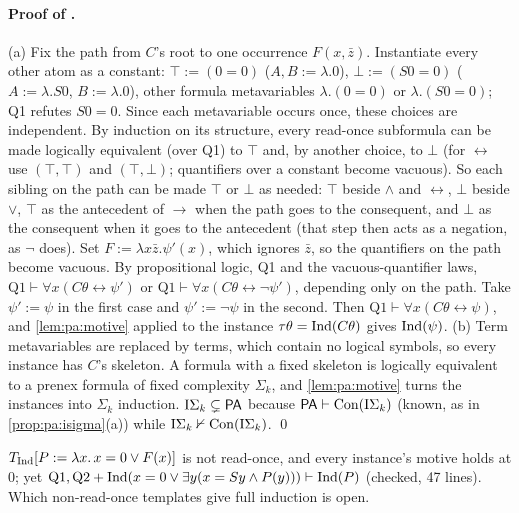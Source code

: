 \paragraph{Proof of .} (a) Fix the path from $C$'s root to one occurrence $F(x,\bar z)$. Instantiate every other atom as a constant: $\top:=(0=0)$ ($A,B:=\lambda.0$), $\bot:=(S0=0)$ ($A:=\lambda.S0$, $B:=\lambda.0$), other formula metavariables $\lambda.(0=0)$ or $\lambda.(S0=0)$; Q1 refutes $S0=0$. Since each metavariable occurs once, these choices are independent. By induction on its structure, every read-once subformula can be made logically equivalent (over Q1) to $\top$ and, by another choice, to $\bot$ (for $\leftrightarrow$ use $(\top,\top)$ and $(\top,\bot)$; quantifiers over a constant become vacuous). So each sibling on the path can be made $\top$ or $\bot$ as needed: $\top$ beside $\wedge$ and $\leftrightarrow$, $\bot$ beside $\vee$, $\top$ as the antecedent of $\to$ when the path goes to the consequent, and $\bot$ as the consequent when it goes to the antecedent (that step then acts as a negation, as $\neg$ does). Set $F:=\lambda x\bar z.\psi'(x)$, which ignores $\bar z$, so the quantifiers on the path become vacuous. By propositional logic, Q1 and the vacuous-quantifier laws, $\mathrm{Q1}\vdash\forall x(C\theta\leftrightarrow\psi')$ or $\mathrm{Q1}\vdash\forall x(C\theta\leftrightarrow\neg\psi')$, depending only on the path. Take $\psi':=\psi$ in the first case and $\psi':=\neg\psi$ in the second. Then $\mathrm{Q1}\vdash\forall x(C\theta\leftrightarrow\psi)$, and \cref{lem:pa:motive} applied to the instance $\tau\theta=\mathrm{Ind}(C\theta)$ gives $\mathrm{Ind}(\psi)$.
(b) Term metavariables are replaced by terms, which contain no logical symbols, so every instance has $C$'s skeleton. A formula with a fixed skeleton is logically equivalent to a prenex formula of fixed complexity $\Sigma_k$, and \cref{lem:pa:motive} turns the instances into $\Sigma_k$ induction. $\mathrm{I}\Sigma_{k}\subsetneq\mathsf{PA}$ because $\mathsf{PA}\vdash\mathrm{Con}(\mathrm{I}\Sigma_{k})$ (known, as in \cref{prop:pa:isigma}(a)) while $\mathrm{I}\Sigma_{k}\nvdash\mathrm{Con}(\mathrm{I}\Sigma_{k})$. \qed

\begin{remark}\pabrk{}\label{rem:pa:shift}
$T_{\mathrm{Ind}}[P:=\lambda x.\,x=0\vee F(x)]$ is not read-once, and every instance's motive holds at $0$; yet $\mathrm{Q1},\mathrm{Q2}+\mathrm{Ind}(x=0\vee\exists y(x=Sy\wedge P(y)))\vdash\mathrm{Ind}(P)$ (checked, 47 lines). Which non-read-once templates give full induction is open.
\end{remark}

